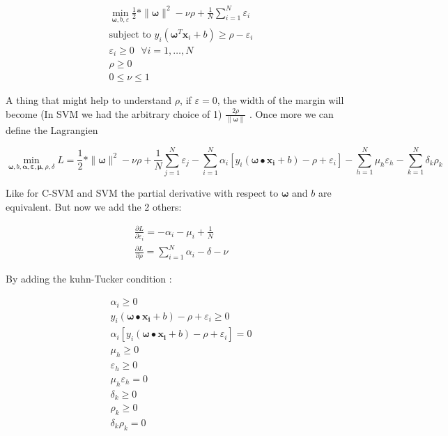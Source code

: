 \documentclass[a4paper,11pt]{article}
\numberwithin{equation}{section}
\begin{document}
\begin{align*}
  \min_{\boldsymbol{\omega},b,\varepsilon} \frac{1}{2}*\|\boldsymbol{\omega}\|^2 - \nu\rho + \frac{1}{N}\sum_{i=1}^{N}\varepsilon_i \\
  \mbox{subject to } y_i(\boldsymbol{\omega}^T\boldsymbol{x}_i+b) \geq \rho -\varepsilon_i\\
  \varepsilon_i \geq 0 \mbox{ } \forall i = 1,\dots,N \\
  \rho \geq 0 \\
  0 \leq \nu  \leq 1
\end{align*}

A thing that might help to understand $\rho$, if $\varepsilon = 0$, the width of the margin will become (In SVM we had the arbitrary choice of 1) $\frac{2\rho}{\|\boldsymbol{\omega}\|}$  . Once more we can define the Lagrangien

\begin{equation}\label{eq:16} 
\min_{\boldsymbol{\omega},b,\boldsymbol{\alpha},\boldsymbol{\varepsilon},\boldsymbol{\mu},\rho,\delta} L= \frac{1}{2}*\|\boldsymbol{\omega}\|^2 - \nu\rho +\frac{1}{N}\sum_{j=1}^{N}\varepsilon_j- \sum_{i=1}^{N}\alpha_i[y_i(\boldsymbol{\omega}\bullet{\boldsymbol{x_i}}+b)-\rho+\varepsilon_i]-\sum_{h=1}^{N}\mu_h\varepsilon_h - \sum_{k=1}^{N}\delta_k\rho_k
\end{equation}

Like for C-SVM and SVM the partial derivative with respect to $\boldsymbol{\omega}$ and $b$ are equivalent. But now we add the 2 others:

\begin{align*}
 \frac{\partial L}{\partial{\varepsilon_i} } = -\alpha_i - \mu_i + \frac{1}{N}\\
 \frac{\partial L}{\partial{\rho} } = \sum_{i=1}^{N}\alpha_i - \delta - \nu  
\end{align*}


By adding the kuhn-Tucker condition :

\begin{align*}
  \alpha_i \geq 0 \\
  y_i(\boldsymbol{\omega}\bullet{\boldsymbol{x_i}}+b)-\rho + \varepsilon_i \geq 0 \\
  \alpha_i[y_i(\boldsymbol{\omega}\bullet{\boldsymbol{x_i}}+b)-\rho + \varepsilon_i] = 0 \\
  \mu_h \geq 0 \\
  \varepsilon_h \geq 0 \\
  \mu_h\varepsilon_h = 0 \\
  \delta_k \geq 0 \\
  \rho_k \geq 0 \\
  \delta_k\rho_k =0
\end{align*}
\end{document}
